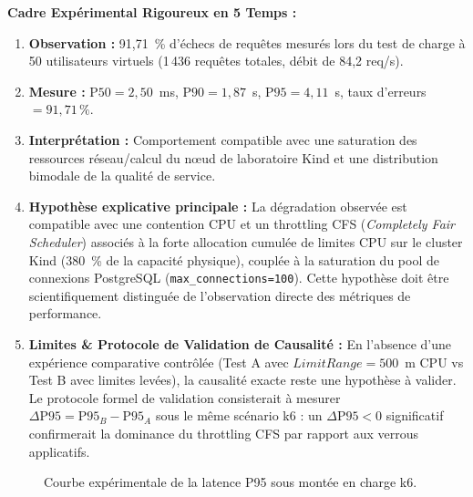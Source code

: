 \noindent\textbf{Cadre Expérimental Rigoureux en 5 Temps :}
\begin{enumerate}
    \item \textbf{Observation :} 91,71~\% d'échecs de requêtes mesurés lors du test de charge à 50 utilisateurs virtuels (1\,436 requêtes totales, débit de 84,2 req/s).
    \item \textbf{Mesure :} $\text{P50} = 2,50$~ms, $\text{P90} = 1,87$~s, $\text{P95} = 4,11$~s, taux d'erreurs $= 91,71\,\%$.
    \item \textbf{Interprétation :} Comportement compatible avec une saturation des ressources réseau/calcul du nœud de laboratoire Kind et une distribution bimodale de la qualité de service.
    \item \textbf{Hypothèse explicative principale :} La dégradation observée est compatible avec une contention CPU et un throttling CFS (\textit{Completely Fair Scheduler}) associés à la forte allocation cumulée de limites CPU sur le cluster Kind (380~\% de la capacité physique), couplée à la saturation du pool de connexions PostgreSQL (\texttt{max\_connections=100}). Cette hypothèse doit être scientifiquement distinguée de l'observation directe des métriques de performance.
    \item \textbf{Limites & Protocole de Validation de Causalité :} En l'absence d'une expérience comparative contrôlée (Test A avec $LimitRange = 500$~m CPU vs Test B avec limites levées), la causalité exacte reste une hypothèse à valider. Le protocole formel de validation consisterait à mesurer $\Delta \text{P95} = \text{P95}_B - \text{P95}_A$ sous le même scénario k6 : un $\Delta \text{P95} < 0$ significatif confirmerait la dominance du throttling CFS par rapport aux verrous applicatifs.
\end{enumerate}

\begin{figure}[H]
\centering
\scriptsize
{}
\caption{Courbe expérimentale de la latence P95 sous montée en charge k6.}
\label{fig:k6_chart_full_section}
\end{figure}


